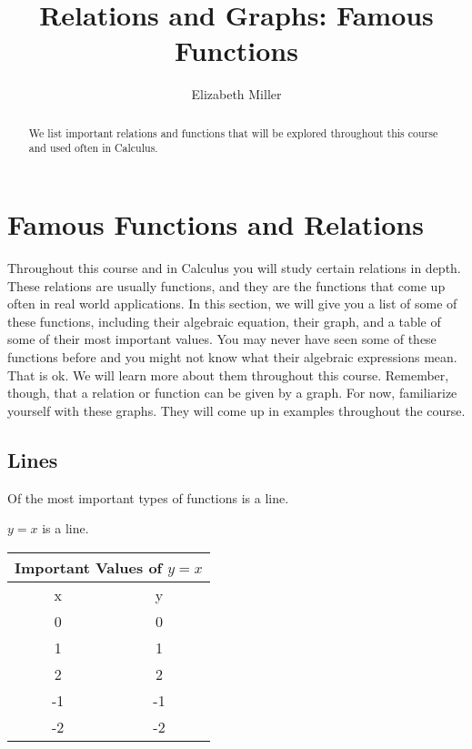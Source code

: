 \documentclass{ximera}
\author{Elizabeth Miller}
\title{Relations and Graphs: Famous Functions}
\begin{document}
\begin{abstract}
We list important relations and functions that will be explored throughout this course and used often in Calculus.
\end{abstract}
\maketitle


\section{Famous Functions and Relations} 
Throughout this course and in Calculus you will study certain relations in depth.  These relations are usually functions, and they are the functions that come up often in real world applications.  In this section, we will give you a list of some of these functions, including their algebraic equation, their graph, and a table of some of their most important values.  You may never have seen some of these functions before and you might not know what their algebraic expressions mean.  That is ok.  We will learn more about them throughout this course.  Remember, though, that a relation or function can be given by a graph.  For now, familiarize yourself with these graphs.  They will come up in examples throughout the course.


\subsection{Lines}
Of the most important types of functions is a line.  

\begin{example}
$y=x$ is a line.


\begin{tabular}{ |c || c|  }
 \hline
 \multicolumn{2}{|c|}{Important Values of $y=x$} \\
\hline
 \hline
 x & y\\
 \hline
 0&0\\
 1&1\\
 2&2\\
 -1&-1\\
 -2&-2\\
 \hline
\end{tabular}

\end{example}
\end{document}
